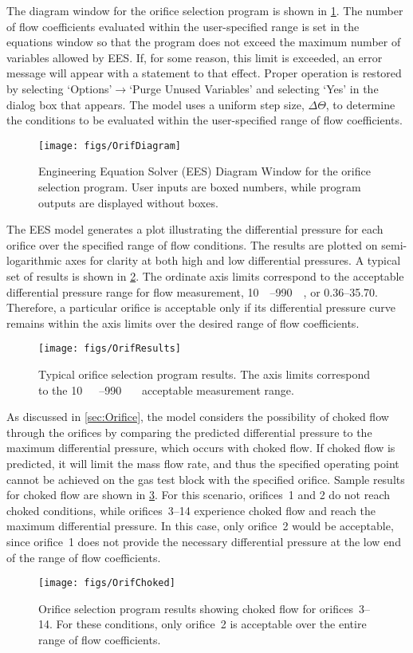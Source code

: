 The diagram window for the orifice selection program is shown in \cref{fig:OrifDiag}.
The number of flow coefficients evaluated within the 
user-specified range is set in the equations window so
that the program does not exceed the maximum number of variables allowed by EES.
If, for some reason, this limit is exceeded, an error message will appear with
a statement to that effect.
Proper operation is restored
by selecting `Options'$\to$`Purge Unused Variables' and selecting `Yes' in the dialog box that appears.
The model uses a uniform step size, $\Delta\Theta$, to determine the conditions 
to be evaluated within the user-specified range of flow coefficients.
\begin{figure}[htbp]
  \centering
  \texttt{[image: figs/OrifDiagram]}
  \caption{Engineering Equation Solver (EES) Diagram Window for the orifice
    selection program. User inputs are boxed numbers, while program outputs 
    are displayed without boxes.}
  \label{fig:OrifDiag}
\end{figure}

The EES model generates a plot illustrating
the differential pressure for each orifice over the specified range of flow conditions.
The results are plotted on semi-logarithmic axes for clarity at both high and low
differential pressures.
A typical set of results is shown in \cref{fig:OrifResults}.
The ordinate axis limits correspond to the acceptable differential pressure range
for flow measurement, \SIrange{10}{990}{\inch{}}, or \SIrange{0.36}{35.70}{\psid}.
Therefore, a particular orifice is acceptable only if its differential pressure curve remains 
within the axis limits over the desired range of flow coefficients.
\begin{figure}[tbp]
  \centering
  \texttt{[image: figs/OrifResults]}
  \caption{Typical orifice selection program results. The axis limits correspond
    to the \SIrange{10}{990}{\inch\protect{}} acceptable measurement range.}
  \label{fig:OrifResults}
\end{figure}

As discussed in \cref{sec:Orifice}, the model considers the possibility of 
choked flow through the orifices by comparing the predicted differential pressure
to the maximum differential pressure, which occurs with choked flow.
If choked flow is predicted, it will limit the mass flow rate, and thus
the specified operating point cannot be achieved on the gas test block with the 
specified orifice.
Sample results for choked flow are shown in \cref{fig:OrifChoked}.
For this scenario, orifices~1 and 2 do not reach choked conditions, while
orifices~3--14 experience choked flow and reach the maximum differential pressure.
In this case, only orifice~2 would be acceptable, since orifice~1 does not provide
the necessary differential pressure at the low end of the range of flow coefficients.
\begin{figure}[tbp]
  \centering
  \texttt{[image: figs/OrifChoked]}
  \caption{Orifice selection program results showing choked flow for orifices~3--14. 
    For these conditions, only orifice~2 is acceptable over the entire range of flow coefficients.}
  \label{fig:OrifChoked}
\end{figure}


